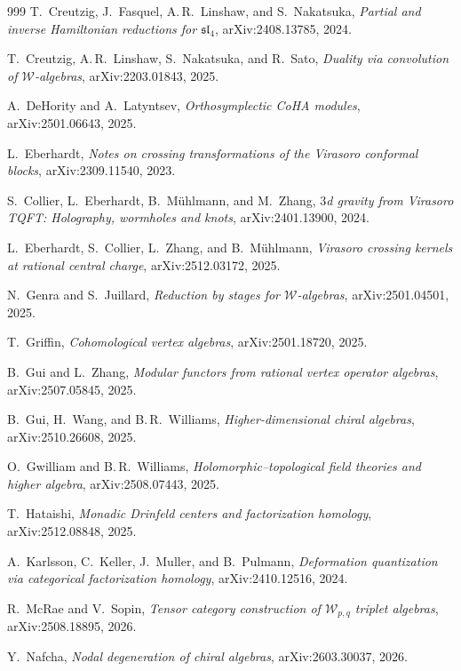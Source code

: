\documentclass[11pt]{memoir}
\begin{document}
\begin{thebibliography}{999}
T.~Creutzig, J.~Fasquel, A.\,R.~Linshaw, and S.~Nakatsuka, \emph{Partial and inverse Hamiltonian reductions for $\mathfrak{sl}_4$}, arXiv:2408.13785, 2024.

T.~Creutzig, A.\,R.~Linshaw, S.~Nakatsuka, and R.~Sato, \emph{Duality via convolution of $\mathcal{W}$-algebras}, arXiv:2203.01843, 2025.

A.~DeHority and A.~Latyntsev, \emph{Orthosymplectic CoHA modules}, arXiv:2501.06643, 2025.

L.~Eberhardt, \emph{Notes on crossing transformations of the Virasoro conformal blocks}, arXiv:2309.11540, 2023.

S.~Collier, L.~Eberhardt, B.~M\"uhlmann, and M.~Zhang, \emph{$3$d gravity from Virasoro TQFT: Holography, wormholes and knots}, arXiv:2401.13900, 2024.

L.~Eberhardt, S.~Collier, L.~Zhang, and B.~M\"uhlmann, \emph{Virasoro crossing kernels at rational central charge}, arXiv:2512.03172, 2025.

N.~Genra and S.~Juillard, \emph{Reduction by stages for $\mathcal{W}$-algebras}, arXiv:2501.04501, 2025.

T.~Griffin, \emph{Cohomological vertex algebras}, arXiv:2501.18720, 2025.

B.~Gui and L.~Zhang, \emph{Modular functors from rational vertex operator algebras}, arXiv:2507.05845, 2025.

B.~Gui, H.~Wang, and B.\,R.~Williams, \emph{Higher-dimensional chiral algebras}, arXiv:2510.26608, 2025.

O.~Gwilliam and B.\,R.~Williams, \emph{Holomorphic--topological field theories and higher algebra}, arXiv:2508.07443, 2025.

T.~Hataishi, \emph{Monadic Drinfeld centers and factorization homology}, arXiv:2512.08848, 2025.

A.~Karlsson, C.~Keller, J.~Muller, and B.~Pulmann, \emph{Deformation quantization via categorical factorization homology}, arXiv:2410.12516, 2024.

R.~McRae and V.~Sopin, \emph{Tensor category construction of $\mathcal{W}_{p,q}$ triplet algebras}, arXiv:2508.18895, 2026.

Y.~Nafcha, \emph{Nodal degeneration of chiral algebras}, arXiv:2603.30037, 2026.


\end{thebibliography}
\end{document}
